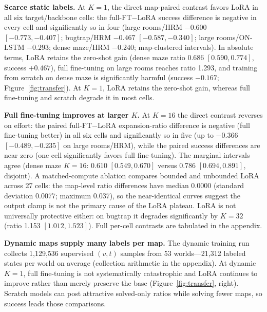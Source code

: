 \documentclass[letterpaper]{article} %
\begin{document}
\textbf{Scarce static labels.} At $K{=}1$, the direct map-paired contrast favors LoRA in all six target/backbone cells: the full-FT$-$LoRA success difference is negative in every cell and significantly so in four (large rooms/HRM $-0.600$ $[-0.773,-0.407]$; bugtrap/HRM $-0.467$ $[-0.587,-0.340]$; large rooms/ON-LSTM $-0.293$; dense maze/HRM $-0.240$; map-clustered intervals). In absolute terms, LoRA retains the zero-shot gain (dense maze ratio 0.686 $[0.590,0.774]$, success $+0.467$), full fine-tuning on large rooms reaches ratio 1.293, and training from scratch on dense maze is significantly harmful (success $-0.167$; Figure~\ref{fig:transfer}). At $K{=}1$, LoRA retains the zero-shot gain, whereas full fine-tuning and scratch degrade it in most cells.

\textbf{Full fine-tuning improves at larger $K$.} At $K{=}16$ the direct contrast reverses on effort: the paired full-FT$-$LoRA expansion-ratio difference is negative (full fine-tuning better) in all six cells and significantly so in five (up to $-0.366$ $[-0.489,-0.235]$ on large rooms/HRM), while the paired success differences are near zero (one cell significantly favors full fine-tuning). The marginal intervals agree (dense maze $K{=}16$: 0.610 $[0.549,0.670]$ versus 0.786 $[0.694,0.891]$, disjoint). A matched-compute ablation compares bounded and unbounded LoRA across 27 cells: the map-level ratio differences have median 0.0000 (standard deviation 0.0077; maximum 0.037), so the near-identical curves suggest the output clamp is not the primary cause of the LoRA plateau. LoRA is not universally protective either: on bugtrap it degrades significantly by $K{=}32$ (ratio 1.153 $[1.012,1.523]$). Full per-cell contrasts are tabulated in the appendix.

\textbf{Dynamic maps supply many labels per map.} The dynamic training run collects 1{,}129{,}536 supervised $(v,t)$ samples from 53 worlds---21{,}312 labeled states per world on average (collection arithmetic in the appendix). At dynamic $K{=}1$, full fine-tuning is not systematically catastrophic and LoRA continues to improve rather than merely preserve the base (Figure~\ref{fig:transfer}, right). Scratch models can post attractive solved-only ratios while solving fewer maps, so success leads those comparisons.
\end{document}
